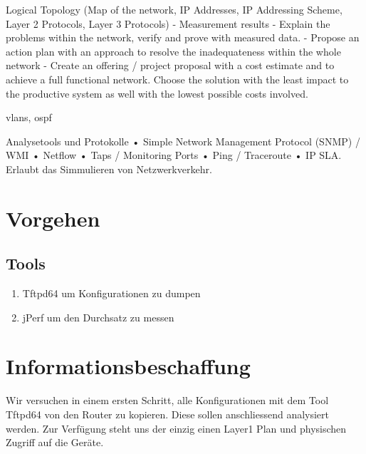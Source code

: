 

\newcommand{\SUBJECT}{Report}
\newcommand{\TITLE}{Analyzing an existing network}




Logical Topology (Map of the network, IP Addresses, IP Addressing Scheme, Layer 2 Protocols, Layer 3 Protocols)
- Measurement results
- Explain the problems within the network, verify and prove with measured data.
- Propose an action plan with an approach to resolve the inadequateness within the whole network
- Create an offering / project proposal with a cost estimate and to achieve a full functional network. Choose the solution with the least impact to the productive system as well with the lowest possible costs involved.

vlans, ospf

Analysetools und Protokolle
• Simple Network Management Protocol (SNMP) / WMI
• Netflow
• Taps / Monitoring Ports
• Ping / Traceroute
• IP SLA. Erlaubt das Simmulieren von Netzwerkverkehr.

\section{Vorgehen}
\subsection{Tools}
\begin{enumerate}
	\item Tftpd64 um Konfigurationen zu dumpen
	\item jPerf um den Durchsatz zu messen
\end{enumerate}




\section{Informationsbeschaffung}
Wir versuchen in einem ersten Schritt, alle Konfigurationen mit dem Tool Tftpd64 von den Router zu kopieren. Diese sollen anschliessend analysiert werden. Zur Verfügung steht uns der einzig einen Layer1 Plan und physischen Zugriff auf die Geräte.

